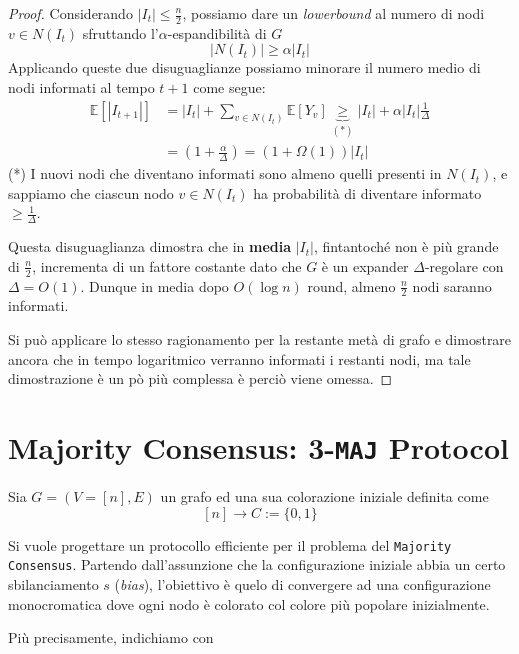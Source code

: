 \begin{teorema}
\begin{proof}
        Considerando $|I_t| \leq \frac{n}{2}$, possiamo dare un \textit{lowerbound} al numero di nodi $v \in N(I_t)$ sfruttando l'$\alpha$-espandibilità di $G$
        \[
            |N(I_t)| \geq \alpha |I_t|
        \]
        Applicando queste due disuguaglianze possiamo minorare il numero medio di nodi informati al tempo $t+1$ come segue:
        \begin{align*}
            \mathbb{E}[|I_{t+1}|] 
            &= |I_t| + \sum_{v \in N(I_t)} \mathbb{E}[Y_v] \underbrace{\geq}_{(*)} |I_t| +\alpha|I_t|\frac{1}{\Delta} \\
            &= \left(1 + \frac{\alpha}{\Delta}\right) = (1 + \Omega(1))|I_t|
        \end{align*}
        (*) I nuovi nodi che diventano informati sono almeno quelli presenti in $N(I_t)$, e sappiamo che ciascun nodo $v \in N(I_t)$ ha probabilità di diventare informato $\geq \frac{1}{\Delta}$.

        Questa disuguaglianza dimostra che in \textbf{media} $|I_t|$, fintantoché non è più grande di $\frac{n}{2}$, incrementa di un fattore costante dato che $G$ è un expander $\Delta$-regolare con $\Delta = O(1)$. Dunque in media dopo $O(\log n)$ round, almeno $\frac{n}{2}$ nodi saranno informati.

        Si può applicare lo stesso ragionamento per la restante metà di grafo e dimostrare ancora che in tempo logaritmico verranno informati i restanti nodi, ma tale dimostrazione è un pò più complessa è perciò viene omessa.
    \end{proof}
\end{teorema}

\newpage

\section{Majority Consensus: 3-\texttt{MAJ} Protocol}

Sia $G = (V = [n], E)$ un grafo ed una sua colorazione iniziale definita come
\[
    [n] \to C := \{0, 1\}
\]

Si vuole progettare un protocollo efficiente per il problema del \texttt{Majority Consensus}. Partendo dall'assunzione che la configurazione iniziale abbia un certo sbilanciamento $s$ (\textit{bias}), l'obiettivo è quelo di convergere ad una configurazione monocromatica dove ogni nodo è colorato col colore più popolare inizialmente.

Più precisamente, indichiamo con

